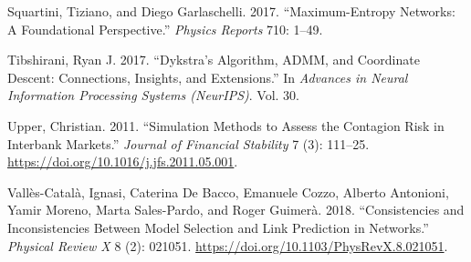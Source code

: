\documentclass[
  a4paper,
]{article}
\newlength{\cslhangindent}
\newenvironment{CSLReferences}[2] %
 {\begin{list}{}{%
  \setlength{\itemindent}{0pt}
  \setlength{\leftmargin}{0pt}
  \setlength{\parsep}{0pt}
  \ifodd #1
   \setlength{\leftmargin}{\cslhangindent}
   \setlength{\itemindent}{-1\cslhangindent}
  \fi
  \setlength{\itemsep}{#2\baselineskip}}}
 {\end{list}}
\begin{document}
\begin{CSLReferences}{1}{0}
Squartini, Tiziano, and Diego Garlaschelli. 2017. {``Maximum-Entropy
Networks: A Foundational Perspective.''} \emph{Physics Reports} 710:
1--49.

Tibshirani, Ryan J. 2017. {``Dykstra's Algorithm, {ADMM}, and Coordinate
Descent: Connections, Insights, and Extensions.''} In \emph{Advances in
Neural Information Processing Systems (NeurIPS)}. Vol. 30.

Upper, Christian. 2011. {``Simulation Methods to Assess the Contagion
Risk in Interbank Markets.''} \emph{Journal of Financial Stability} 7
(3): 111--25. \url{https://doi.org/10.1016/j.jfs.2011.05.001}.

Vallès-Català, Ignasi, Caterina De Bacco, Emanuele Cozzo, Alberto
Antonioni, Yamir Moreno, Marta Sales-Pardo, and Roger Guimerà. 2018.
{``Consistencies and Inconsistencies Between Model Selection and Link
Prediction in Networks.''} \emph{Physical Review X} 8 (2): 021051.
\url{https://doi.org/10.1103/PhysRevX.8.021051}.

\end{CSLReferences}
\end{document}
